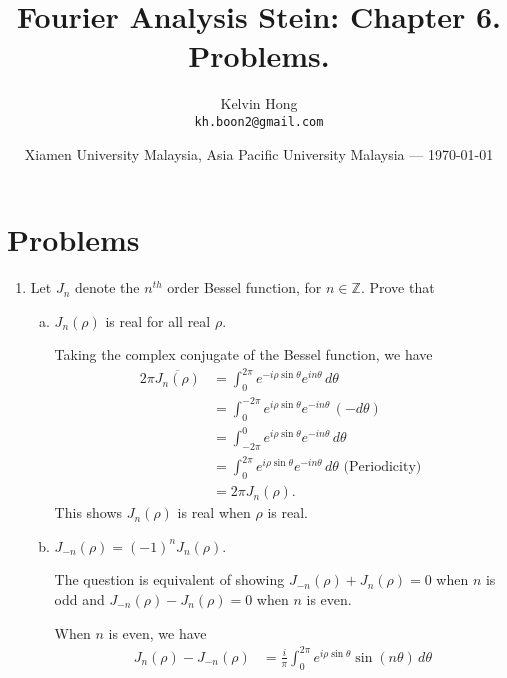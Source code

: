 \documentclass{article}
\title{Fourier Analysis Stein: Chapter 6. Problems.} %
\author{Kelvin Hong\\ \texttt{kh.boon2@gmail.com}} %
\date{Xiamen University Malaysia, Asia Pacific University Malaysia --- \today} %
\begin{document}
\maketitle %

\section{Problems}

\begin{enumerate}
    \item Let $J_n$ denote the $n^{th}$ order Bessel function, for $n\in \mathbb Z$. Prove that 
    \begin{enumerate}[(a)]
        \item $J_n(\rho)$ is real for all real $\rho$. 

        \begin{solution}
            Taking the complex conjugate of the Bessel function, we have
            \begin{align*}
                2\pi \overline{J_n(\rho)} &= 
                \int_0^{2\pi} e^{-i\rho\sin\theta} e^{in\theta}\, d\theta \\
                &= \int_0^{-2\pi} e^{i\rho\sin\theta} e^{-in\theta}\, (-d\theta) \\
                &= \int_{-2\pi}^0 e^{i\rho\sin\theta} e^{-in\theta}\, d\theta \\
                &= \int_0^{2\pi} e^{i\rho\sin\theta} e^{-in\theta}\, d\theta \text{ (Periodicity) } \\ 
                &= 2\pi J_n(\rho).
            \end{align*}
            This shows $J_n(\rho)$ is real when $\rho$ is real.
        \end{solution}
        

        \item $J_{-n}(\rho)=(-1)^n J_n(\rho)$.

        \begin{solution}
            The question is equivalent of showing $J_{-n}(\rho)+J_n(\rho)=0$ when $n$ is odd and 
            $J_{-n}(\rho)-J_n(\rho)=0$ when $n$ is even. 

            When $n$ is even, we have 
            \begin{align*}
                J_n(\rho)-J_{-n}(\rho) &= \frac{i}{\pi} \int_0^{2\pi} e^{i\rho\sin\theta} \sin(n\theta)\, d\theta
            \end{align*}


\end{solution}
\end{enumerate}
\end{enumerate}
\end{document}
